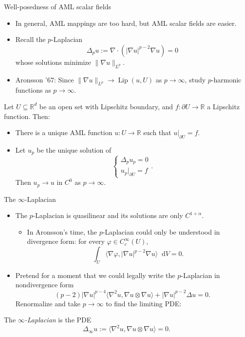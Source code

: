 \documentclass[10pt]{beamer}
\newcommand{\RR}{\mathbb{R}}
\newcommand*\dif{\mathop{}\!\mathrm{d}}
\DeclareMathOperator{\Lip}{Lip}
\begin{document}
\begin{frame}{Well-posedness of AML scalar fields}
\begin{itemize}
\item In general, AML mappings are too hard, but AML scalar fields are easier. \pause
\item Recall the $p$-Laplacian 
$$\Delta_p u := \nabla \cdot (|\nabla u|^{p - 2} \nabla u) = 0$$
whose solutions minimize $\|\nabla u\|_{L^p}$. \pause
\item Aronsson '67: Since $\|\nabla u\|_{L^p} \to \Lip(u, U)$ as $p \to \infty$, study $p$-harmonic functions as $p \to \infty$. \pause
\end{itemize}

\begin{theorem}[Jensen '93]
Let $U \subseteq \RR^d$ be an open set with Lipschitz boundary, and $f: \partial U \to \RR$ a Lipschitz function. Then: \pause
\begin{itemize}
\item There is a unique AML function $u: U \to \RR$ such that $u|_{\partial U} = f$. \pause
\item Let $u_p$ be the unique solution of 
$$\begin{cases}\Delta_p u_p = 0 \\ u_p|_{\partial U} = f \end{cases}.$$
Then $u_p \to u$ in $C^0$ as $p \to \infty$.
\end{itemize}
\end{theorem}
\end{frame}

\begin{frame}{The $\infty$-Laplacian}
\begin{itemize}
\item The $p$-Laplacian is quasilinear and its solutions are only $C^{1 + \alpha}$.
\begin{itemize}
\item In Aronsson's time, the $p$-Laplacian could only be understood in divergence form: for every $\varphi \in C^\infty_c(U)$,
$$\int_U \langle \nabla \varphi, |\nabla u|^{p - 2} \nabla u\rangle \dif V = 0.$$
\end{itemize}
\item Pretend for a moment that we could legally write the $p$-Laplacian in nondivergence form 
$$(p - 2) |\nabla u|^{p - 4} \langle \nabla^2 u, \nabla u \otimes \nabla u\rangle + |\nabla u|^{p - 2} \Delta u = 0.$$
Renormalize and take $p \to \infty$ to find the limiting PDE: \pause
\end{itemize} 

\begin{definition}
The \emph{$\infty$-Laplacian} is the PDE 
$$\Delta_\infty u := \langle \nabla^2 u, \nabla u \otimes \nabla u\rangle = 0.$$
\end{definition}
\end{frame}
\end{document}

